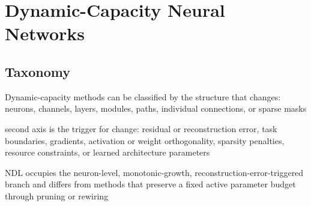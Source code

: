 \section{Dynamic-Capacity Neural Networks}

\subsection{Taxonomy}
\begin{draftpoints}
  \item Dynamic-capacity methods can be classified by the structure that changes: neurons, channels, layers, modules, paths, individual connections, or sparse masks
  \item second axis is the trigger for change: residual or reconstruction error, task boundaries, gradients, activation or weight orthogonality, sparsity penalties, resource constraints, or learned architecture parameters
  \item NDL occupies the neuron-level, monotonic-growth, reconstruction-error-triggered branch and differs from methods that preserve a fixed active parameter budget through pruning or rewiring \parencite{draelos2017neurogenesis}
\end{draftpoints}

